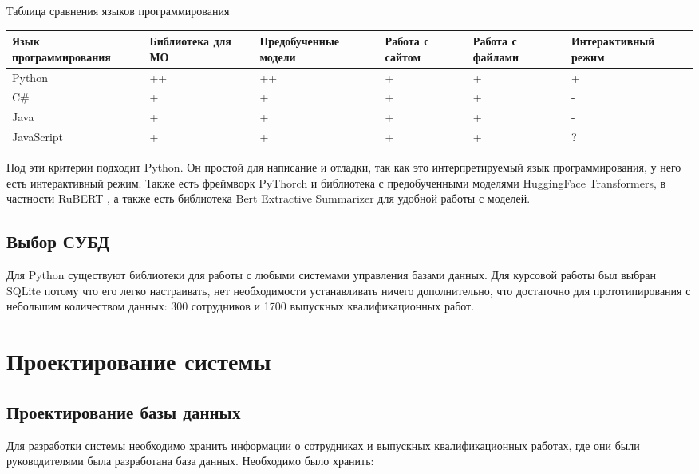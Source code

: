 \documentclass[PI,KR]{HSEUniversity}
\begin{document}
\begin{TABLE}[!h]{Таблица сравнения языков программирования \label{tbl:tableProg}}
	\begin{tabular}[c]{|p{3cm}|p{2cm}|p{3cm}|p{2cm}|p{2cm}|p{3cm}|}
		\hline
		Язык программирования & Библиотека для МО & Предобученные модели & Работа с сайтом & Работа с файлами & Интерактивный режим\\ \hline
		Python 		& ++ & ++ & + & + & + \\ \hline
		C\# 		& +  & +  & + & + & - \\ \hline
		Java 		& +  & +  & + & + & - \\ \hline
		JavaScript 	& +  & +  & + & + & ? \\ \hline
	\end{tabular}
\end{TABLE}

Под эти критерии подходит Python. Он простой для написание и отладки, так как это интерпретируемый язык программирования, у него есть интерактивный режим. Также есть фреймворк PyThorch и библиотека с предобученными моделями HuggingFace Transformers, в частности RuBERT \cite{kuratov2019adaptation}, а также есть библиотека Bert Extractive Summarizer \cite{miller2019leveraging} для удобной работы с моделей.

\section{Выбор СУБД}
Для Python существуют библиотеки для работы с любыми системами управления базами данных. Для курсовой работы был выбран SQLite потому что его легко настраивать, нет необходимости устанавливать ничего дополнительно, что достаточно для прототипирования с небольшим количеством данных: 300 сотрудников и 1700 выпускных квалификационных работ.
\chapter{Проектирование системы}
\section{Проектирование базы данных}
Для разработки системы необходимо хранить информации о сотрудниках и выпускных квалификационных работах, где они были руководителями была разработана база данных. Необходимо было хранить:
\end{document}
